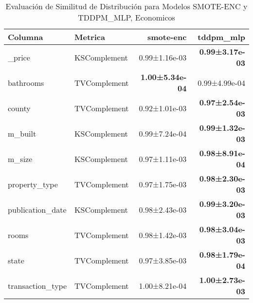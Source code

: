 \begin{table}[H]
\centering
\fontsize{10}{14}\selectfont
\caption{Evaluaci\'on de Similitud de Distribuci\'on para Modelos SMOTE-ENC y TDDPM\_MLP, Economicos}
\label{table-shape-economicos-a}
\begin{tabular}{|l|l|r|r|}
\hline
\rowcolor[gray]{0.8}
Columna & Metrica & smote-enc & tddpm\_mlp \\
\hline \_price & KSComplement & 0.99±1.16e-03 & \bfseries 0.99±3.17e-03 \\
\hline bathrooms & TVComplement & \bfseries 1.00±5.34e-04 & 0.99±4.99e-04 \\
\hline county & TVComplement & 0.92±1.01e-03 & \bfseries 0.97±2.54e-03 \\
\hline m\_built & KSComplement & 0.99±7.24e-04 & \bfseries 0.99±1.32e-03 \\
\hline m\_size & KSComplement & 0.97±1.11e-03 & \bfseries 0.98±8.91e-04 \\
\hline property\_type & TVComplement & 0.97±1.75e-03 & \bfseries 0.98±2.30e-03 \\
\hline publication\_date & KSComplement & 0.98±2.43e-03 & \bfseries 0.99±3.20e-03 \\
\hline rooms & TVComplement & 0.98±1.42e-03 & \bfseries 0.98±3.04e-03 \\
\hline state & TVComplement & 0.97±3.85e-03 & \bfseries 0.98±1.79e-04 \\
\hline transaction\_type & TVComplement & 1.00±8.21e-04 & \bfseries 1.00±2.73e-03 \\
\hline
\end{tabular}
\end{table}

